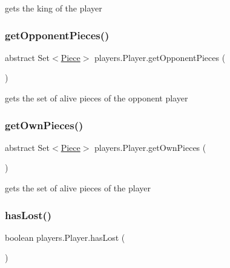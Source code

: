gets the king of the player \mbox{\label{classplayers_1_1_player_a71b0707e3607a9fdc2d8b94b49be1394}} 
\subsubsection{\texorpdfstring{get\+Opponent\+Pieces()}{getOpponentPieces()}}
{\footnotesize\ttfamily abstract Set$<$\mbox{\hyperlink{classpieces_1_1_piece}{Piece}}$>$ players.\+Player.\+get\+Opponent\+Pieces (\begin{DoxyParamCaption}{ }\end{DoxyParamCaption})\hspace{0.3cm}{\ttfamily [abstract]}}

gets the set of alive pieces of the opponent player \mbox{\label{classplayers_1_1_player_af1c0e492177ecbfa6bdc8e44b968ead3}} 
\subsubsection{\texorpdfstring{get\+Own\+Pieces()}{getOwnPieces()}}
{\footnotesize\ttfamily abstract Set$<$\mbox{\hyperlink{classpieces_1_1_piece}{Piece}}$>$ players.\+Player.\+get\+Own\+Pieces (\begin{DoxyParamCaption}{ }\end{DoxyParamCaption})\hspace{0.3cm}{\ttfamily [abstract]}}

gets the set of alive pieces of the player \mbox{\label{classplayers_1_1_player_a410730e0aede2a7253250ac892fc02e7}} 
\subsubsection{\texorpdfstring{has\+Lost()}{hasLost()}}
{\footnotesize\ttfamily boolean players.\+Player.\+has\+Lost (\begin{DoxyParamCaption}{ }\end{DoxyParamCaption})}


